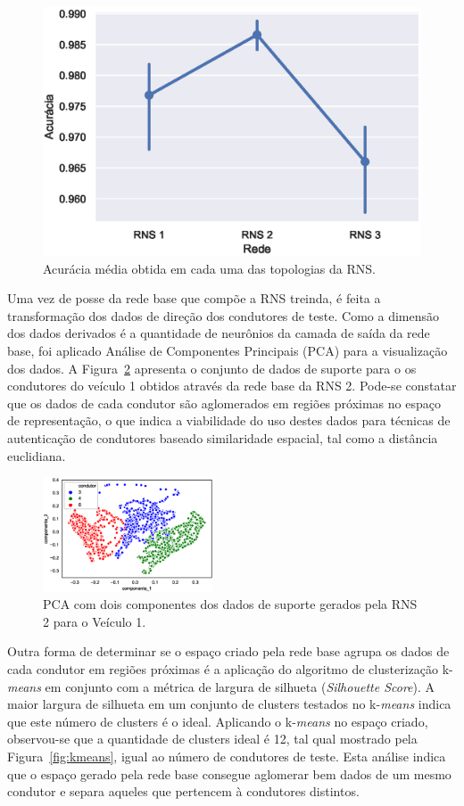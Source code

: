 \documentclass[conference,harvard,brazil,english]{sbatex}
\begin{document}
\begin{figure}[!ht]
\centering
\includegraphics[width=.45\textwidth]{acc.eps}
\caption{Acurácia média obtida em cada uma das topologias da RNS.}
\label{fig:acc}
\end{figure}

Uma vez de posse da rede base que compõe a RNS treinda, é feita a transformação dos dados de direção dos condutores de teste. Como a dimensão dos dados derivados é a quantidade de neurônios da camada de saída da rede base, foi aplicado Análise de Componentes Principais (PCA) para a visualização dos dados. A Figura~\ref{fig:pca} apresenta o conjunto de dados de suporte para o os condutores do veículo 1 obtidos através da rede base da RNS 2. Pode-se constatar que os dados de cada condutor são aglomerados em regiões próximas no espaço de representação, o que indica a viabilidade do uso destes dados para técnicas de autenticação de condutores baseado similaridade espacial, tal como a distância euclidiana.

\begin{figure}[!ht]
\centering
\includegraphics[width=0.45\textwidth]{pca.eps}
\caption{PCA com dois componentes dos dados de suporte gerados pela RNS 2 para o Veículo 1.}
\label{fig:pca}
\end{figure}

Outra forma de determinar se o espaço criado pela rede base agrupa os dados de cada condutor em regiões próximas é a aplicação do algoritmo de clusterização k-\textit{means} em conjunto com a métrica de largura de silhueta (\textit{Silhouette Score}). A maior largura de silhueta em um conjunto de clusters testados no k-\textit{means} indica que este número de clusters é o ideal. Aplicando o k-\textit{means} no espaço criado, observou-se que a quantidade de clusters ideal é 12, tal qual mostrado pela Figura~\ref{fig:kmeans}, igual ao número de condutores de teste. Esta análise indica que o espaço gerado pela rede base consegue aglomerar bem dados de um mesmo condutor e separa aqueles que pertencem à condutores distintos.
\end{document}
